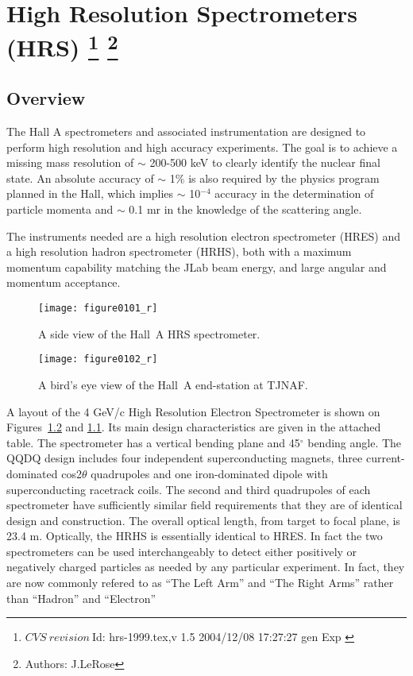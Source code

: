 \chapter[High Resolution Spectrometers (HRS)]{High Resolution Spectrometers (HRS)
\footnote{
  $CVS~revision~ $Id: hrs-1999.tex,v 1.5 2004/12/08 17:27:27 gen Exp $ $ 
}
\footnote{Authors: J.LeRose }
}
\label{chap:hrs}
\section{Overview}
   
The Hall A spectrometers and associated instrumentation are designed to 
perform high resolution and high accuracy experiments.  The goal is to 
achieve a missing mass resolution of $\sim$ 200-500 keV to clearly 
identify the nuclear final state.  An absolute accuracy of $\sim$ 1\% is 
also required by the physics program planned in the Hall, which implies 
$\sim$ 10$^{-4}$ accuracy in the determination of particle momenta and 
$\sim$ 0.1 mr in the knowledge of the scattering angle.

The instruments needed are a high resolution electron spectrometer 
(HRES) and a high resolution hadron spectrometer (HRHS), both with a 
maximum momentum capability matching the JLab beam energy, and large 
angular and momentum acceptance.

\begin{figure}[tbp]
\begin{center}
\texttt{[image: figure0101\_r]}
\caption[Spectrometers: Elevation View of Hall~A HRS]{A side view of the Hall~A
HRS spectrometer.}  
\label{fig:hrs_ev}
\end{center}
\end{figure}
 
\begin{figure}[tbp]
\begin{center}
\texttt{[image: figure0102\_r]}
\caption[Spectrometers: Plan View of Hall~A]{A bird's eye view of the Hall~A
end-station at TJNAF.}  
\label{fig:hrs_pv}
\end{center}
\end{figure}


A layout of the 4 GeV/c High Resolution Electron Spectrometer is shown 
on Figures~\ref{fig:hrs_pv} and \ref{fig:hrs_ev}.
Its main design characteristics are 
given in the attached table.  The spectrometer has a vertical bending 
plane and 45$^{\circ}$ bending angle.  The QQDQ design includes four 
independent superconducting magnets, three current-dominated 
cos2$\theta $ quadrupoles and one iron-dominated dipole with 
superconducting racetrack coils.  The second and third quadrupoles of 
each spectrometer have sufficiently similar field requirements that they 
are of identical design and construction.  The overall optical length, 
from target to focal plane, is 23.4 m.  Optically, the HRHS 
is essentially identical to HRES. In fact the two spectrometers can be used 
interchangeably to detect either positively or negatively charged particles 
as needed by any particular experiment. In fact, they are now commonly refered to 
as ``The Left Arm'' and ``The Right Arms'' rather than ``Hadron'' and ``Electron'' 

